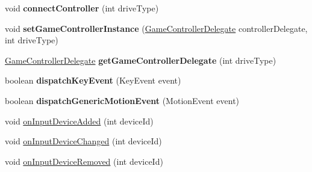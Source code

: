 \begin{DoxyCompactItemize}
\item 
\mbox{\label{classorg_1_1cocos2dx_1_1lib_1_1GameControllerActivity_a87bc928c87d5c864a926cfd2d65321b0}} 
void {\bfseries connect\+Controller} (int drive\+Type)
\item 
\mbox{\label{classorg_1_1cocos2dx_1_1lib_1_1GameControllerActivity_a1c55b30c56611ba907bfe7195feedc1d}} 
void {\bfseries set\+Game\+Controller\+Instance} (\hyperlink{interfaceorg_1_1cocos2dx_1_1lib_1_1GameControllerDelegate}{Game\+Controller\+Delegate} controller\+Delegate, int drive\+Type)
\item 
\mbox{\label{classorg_1_1cocos2dx_1_1lib_1_1GameControllerActivity_a71905b8072d49fb1c0eab7f7815531d7}} 
\hyperlink{interfaceorg_1_1cocos2dx_1_1lib_1_1GameControllerDelegate}{Game\+Controller\+Delegate} {\bfseries get\+Game\+Controller\+Delegate} (int drive\+Type)
\item 
\mbox{\label{classorg_1_1cocos2dx_1_1lib_1_1GameControllerActivity_a07b3eca220c62f9d78f481afbc4519ae}} 
boolean {\bfseries dispatch\+Key\+Event} (Key\+Event event)
\item 
\mbox{\label{classorg_1_1cocos2dx_1_1lib_1_1GameControllerActivity_aa47a8a2433311b1d52754ef443aa7cb9}} 
boolean {\bfseries dispatch\+Generic\+Motion\+Event} (Motion\+Event event)
\item 
void \hyperlink{classorg_1_1cocos2dx_1_1lib_1_1GameControllerActivity_a25ed4cb26b6bac381d1befce69f7e638}{on\+Input\+Device\+Added} (int device\+Id)
\item 
void \hyperlink{classorg_1_1cocos2dx_1_1lib_1_1GameControllerActivity_a26ce9a1e1b6f4a726d6c775633a80b03}{on\+Input\+Device\+Changed} (int device\+Id)
\item 
void \hyperlink{classorg_1_1cocos2dx_1_1lib_1_1GameControllerActivity_aec412cd3d3092fa8d9c0a90567062111}{on\+Input\+Device\+Removed} (int device\+Id)
\end{DoxyCompactItemize}

